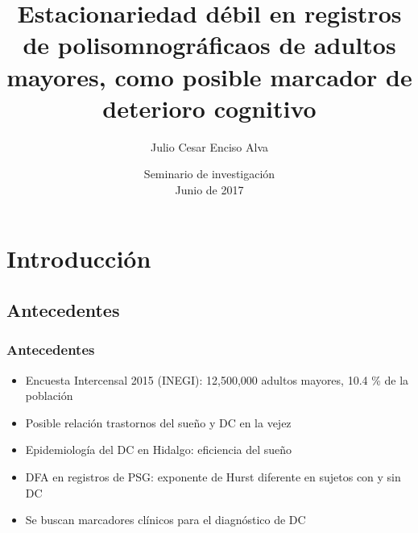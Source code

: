 \documentclass{beamer}
\title[Estacionariedad en PSG de adultos mayores]
{Estacionariedad d\'ebil en registros de polisomnogr\'aficaos de adultos mayores,
como posible marcador de deterioro cognitivo}
\author[Enciso Alva]
{Julio Cesar Enciso Alva}
\institute[LIMA]
{Licenciatura en Matem\'aticas Aplicadas}
\date[Junio 2017]
{Seminario de investigaci\'on\\ Junio de 2017}
\begin{document}
\frame{\titlepage}

\begin{frame}
\tableofcontents
\end{frame}


\section{Introducci\'on}


\subsection{Antecedentes}

\begin{frame}\frametitle{Antecedentes}
\begin{itemize}
\item Encuesta Intercensal 2015 (INEGI): 12,500,000 adultos mayores, 10.4 \%  de la 
poblaci\'on %

\item Posible relaci\'on trastornos del sue\~no y DC en la vejez

\item Epidemiolog\'ia del DC en Hidalgo: eficiencia del sue\~no%

\item DFA en registros de PSG:%
exponente de Hurst diferente en sujetos 
con y sin DC 

\item Se buscan marcadores cl\'inicos para el diagn\'ostico de DC
\end{itemize}
\end{frame}

\end{document}

